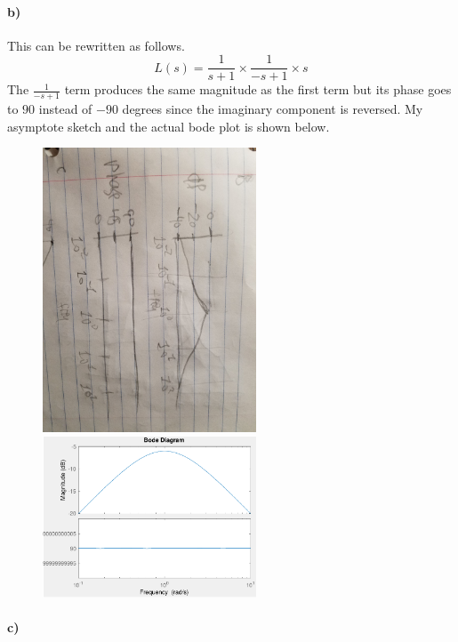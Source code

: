 \documentclass[12pt]{article}
\begin{document}
\paragraph{b)}

This can be rewritten as follows.
\[L(s)=\frac{1}{s+1}\times\frac{1}{-s+1}\times s\]
The \(\frac{1}{-s+1}\) term produces the same magnitude as the first term but its phase goes to \(90\) instead of \(-90\) degrees since the imaginary component is reversed.
My asymptote sketch and the actual bode plot is shown below.
\begin{figure}[H]
    \begin{center}
        \includegraphics[width=2.5in]{problem1b.jpg}
        \includegraphics[width=2.5in]{problem1b.pdf}
    \end{center}
\end{figure}

\paragraph{c)}
\end{document}
